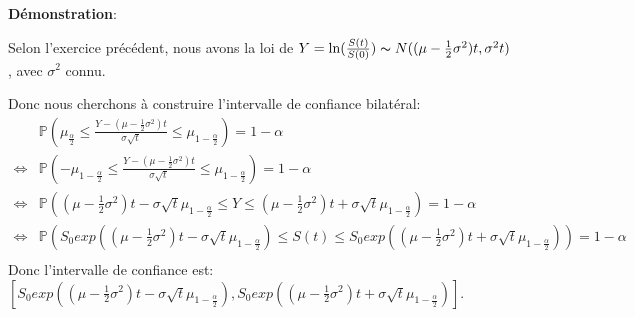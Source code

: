 \documentclass[a4paper,10pt]{report}
\begin{document}
\noindent \textbf{Démonstration}:
\par \noindent Selon l'exercice précédent, nous avons la loi de $Y = \ln(\frac{S(t)}{S(0)}) \thicksim N((\mu - \frac{1}{2} \sigma^{2})t, \sigma^{2} t)$, avec $\sigma^{2}$ connu.
\par \noindent Donc nous cherchons à construire l'intervalle de confiance bilatéral:
\begin{align*}
	&\mathbb{P}(\mu_{\frac{\alpha}{2}} \leq \frac{Y - (\mu - \frac{1}{2} \sigma^{2})t}{\sigma \sqrt{t}} \leq \mu_{1- \frac{\alpha}{2}}) = 1 - \alpha \\
	\Leftrightarrow &\mathbb{P}(-\mu_{1 - \frac{\alpha}{2}} \leq \frac{Y - (\mu - \frac{1}{2} \sigma^{2})t}{\sigma \sqrt{t}} \leq \mu_{1- \frac{\alpha}{2}}) = 1 - \alpha \\
	\Leftrightarrow &\mathbb{P}((\mu - \frac{1}{2} \sigma^{2})t -\sigma \sqrt{t} \mu_{1 - \frac{\alpha}{2}} \leq Y \leq (\mu - \frac{1}{2} \sigma^{2})t + \sigma \sqrt{t} \mu_{1- \frac{\alpha}{2}}) = 1 - \alpha \\
	\Leftrightarrow &\mathbb{P}(S_{0}exp((\mu - \frac{1}{2} \sigma^{2})t -\sigma \sqrt{t} \mu_{1 - \frac{\alpha}{2}}) \leq S(t) \leq S_{0}exp((\mu - \frac{1}{2} \sigma^{2})t + \sigma \sqrt{t} \mu_{1- \frac{\alpha}{2}})) = 1 - \alpha \\
\end{align*}  
\noindent Donc l'intervalle de confiance est: $[S_{0}exp((\mu - \frac{1}{2} \sigma^{2})t -\sigma \sqrt{t} \mu_{1 - \frac{\alpha}{2}}),  S_{0}exp((\mu - \frac{1}{2} \sigma^{2})t + \sigma \sqrt{t} \mu_{1- \frac{\alpha}{2}})]$.
\end{document}
